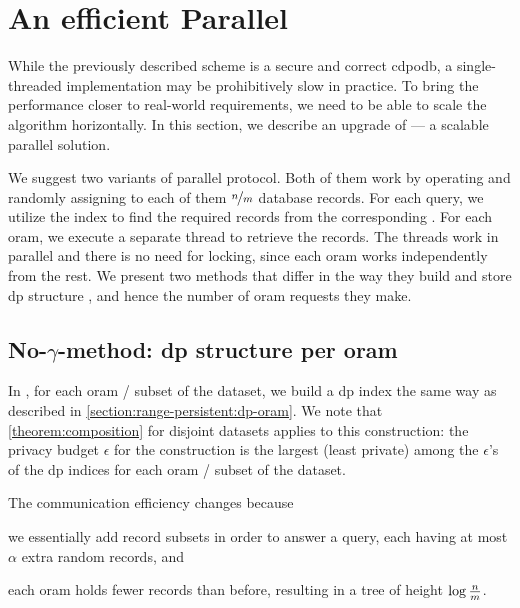 \section{An efficient Parallel \texorpdfstring{\epsolute{}}{Epsolute}}\label{section:range-persistent:prallel-dp-oram}

	While the previously described scheme is a secure and correct \acrshort{cdpodb}, a single-threaded implementation may be prohibitively slow in practice.
	To bring the performance closer to real-world requirements, we need to be able to scale the algorithm horizontally.
	In this section, we describe an upgrade of \epsolute{} --- a scalable parallel solution.

	We suggest two variants of parallel \epsolute{} protocol.
	Both of them work by operating \oramsNumber{}  and randomly assigning to each of them $\nicefrac{n}{m}$ database records.
	For each query, we utilize the index \indexI{} to find the required records from the corresponding .
	For each \acrshort{oram}, we execute a separate thread to retrieve the records.
	The threads work in parallel and there is no need for locking, since each \acrshort{oram} works independently from the rest.
	We present two methods that differ in the way they build and store \acrshort{dp} structure \serverDS{}, and hence the number of \acrshort{oram} requests they make.

	\subsection{\texorpdfstring{No-$\gamma$-method}{No-gamma-method}: \acrshort{dp} structure per \acrshort{oram}}

		In \protocolNoGamma{}, for each \acrshort{oram} / subset of the dataset, we build a \acrshort{dp} index the same way as described in \cref{section:range-persistent:dp-oram}.
		We note that \cref{theorem:composition} for disjoint datasets applies to this construction: the privacy budget $\epsilon$ for the construction is the largest (least private) among the $\epsilon$'s of the \acrshort{dp} indices for each \acrshort{oram} / subset of the dataset.

		The communication efficiency changes because
		\begin{enumerate*}[label={(\roman*)}]
			\item
				we essentially add \oramsNumber{} record subsets in order to answer a query, each having at most $\alpha$ extra random records, and
			\item
				each \acrshort{oram} holds fewer records than before, resulting in a tree of height $\log \frac{n}{m}$.
		\end{enumerate*}

